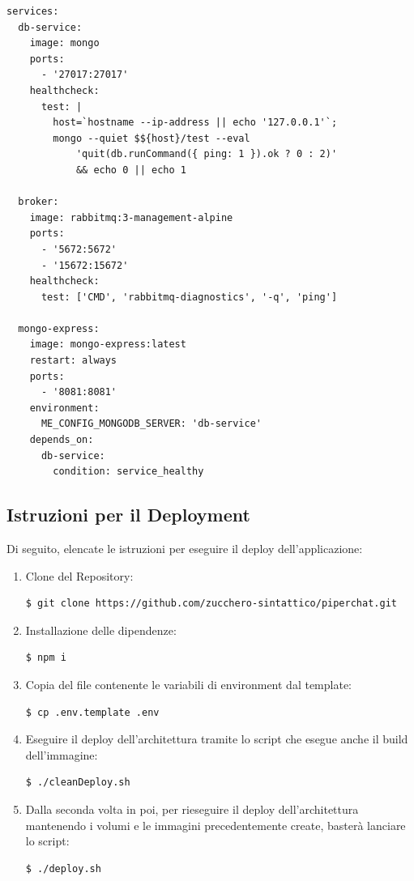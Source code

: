 \begin{lstlisting}[style=yaml, caption={Testing Deploy}, label=lst:testing:deploy]
services:
  db-service:
    image: mongo
    ports:
      - '27017:27017'
    healthcheck:
      test: |
        host=`hostname --ip-address || echo '127.0.0.1'`;
        mongo --quiet $${host}/test --eval
            'quit(db.runCommand({ ping: 1 }).ok ? 0 : 2)' 
            && echo 0 || echo 1

  broker:
    image: rabbitmq:3-management-alpine
    ports:
      - '5672:5672'
      - '15672:15672'
    healthcheck:
      test: ['CMD', 'rabbitmq-diagnostics', '-q', 'ping']

  mongo-express:
    image: mongo-express:latest
    restart: always
    ports:
      - '8081:8081'
    environment:
      ME_CONFIG_MONGODB_SERVER: 'db-service'
    depends_on:
      db-service:
        condition: service_healthy

\end{lstlisting}

%
%
%
\subsection{Istruzioni per il Deployment}

Di seguito, elencate le istruzioni per eseguire il deploy dell'applicazione:

\begin{enumerate}
    \item Clone del Repository:
\begin{verbatim}
$ git clone https://github.com/zucchero-sintattico/piperchat.git
\end{verbatim}

    \item Installazione delle dipendenze:
\begin{verbatim}
$ npm i
\end{verbatim}

    \item Copia del file contenente le variabili di environment dal template:
\begin{verbatim}
$ cp .env.template .env
\end{verbatim}

    \item Eseguire il deploy dell'architettura tramite lo script che esegue anche il build dell'immagine:
\begin{verbatim}
$ ./cleanDeploy.sh
\end{verbatim}

    \item Dalla seconda volta in poi, per rieseguire il deploy dell'architettura mantenendo i volumi e le immagini precedentemente create, basterà lanciare lo script:
\begin{verbatim}
$ ./deploy.sh
\end{verbatim}
\end{enumerate}
